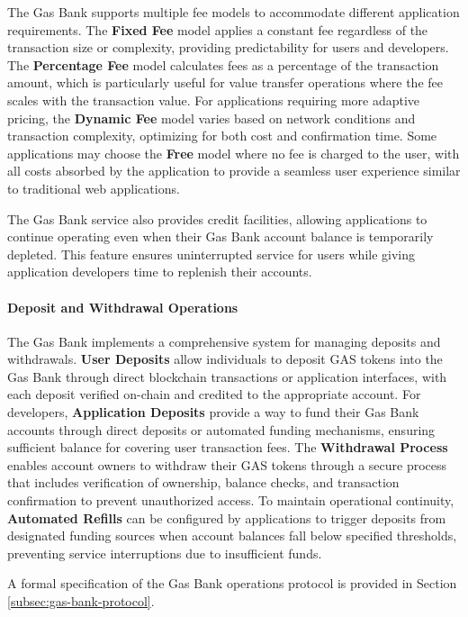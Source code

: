 \documentclass[12pt,a4paper]{article}
\begin{document}
The Gas Bank supports multiple fee models to accommodate different application requirements. The \textbf{Fixed Fee} model applies a constant fee regardless of the transaction size or complexity, providing predictability for users and developers. The \textbf{Percentage Fee} model calculates fees as a percentage of the transaction amount, which is particularly useful for value transfer operations where the fee scales with the transaction value. For applications requiring more adaptive pricing, the \textbf{Dynamic Fee} model varies based on network conditions and transaction complexity, optimizing for both cost and confirmation time. Some applications may choose the \textbf{Free} model where no fee is charged to the user, with all costs absorbed by the application to provide a seamless user experience similar to traditional web applications.

The Gas Bank service also provides credit facilities, allowing applications to continue operating even when their Gas Bank account balance is temporarily depleted. This feature ensures uninterrupted service for users while giving application developers time to replenish their accounts.



\paragraph{Deposit and Withdrawal Operations}
The Gas Bank implements a comprehensive system for managing deposits and withdrawals. \textbf{User Deposits} allow individuals to deposit GAS tokens into the Gas Bank through direct blockchain transactions or application interfaces, with each deposit verified on-chain and credited to the appropriate account. For developers, \textbf{Application Deposits} provide a way to fund their Gas Bank accounts through direct deposits or automated funding mechanisms, ensuring sufficient balance for covering user transaction fees. The \textbf{Withdrawal Process} enables account owners to withdraw their GAS tokens through a secure process that includes verification of ownership, balance checks, and transaction confirmation to prevent unauthorized access. To maintain operational continuity, \textbf{Automated Refills} can be configured by applications to trigger deposits from designated funding sources when account balances fall below specified thresholds, preventing service interruptions due to insufficient funds.

A formal specification of the Gas Bank operations protocol is provided in Section \ref{subsec:gas-bank-protocol}.
\end{document}
